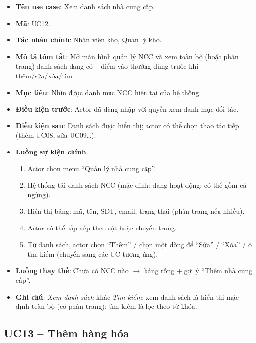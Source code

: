 \begin{itemize}[leftmargin=1.5cm]
    \item \textbf{Tên use case}: Xem danh sách nhà cung cấp.
    \item \textbf{Mã}: UC12.
    \item \textbf{Tác nhân chính}: Nhân viên kho, Quản lý kho.
    \item \textbf{Mô tả tóm tắt}: Mở màn hình quản lý NCC và xem toàn bộ (hoặc phân trang) danh sách đang có -- điểm vào thường dùng trước khi thêm/sửa/xóa/tìm.
    \item \textbf{Mục tiêu}: Nhìn được danh mục NCC hiện tại của hệ thống.
    \item \textbf{Điều kiện trước}: Actor đã đăng nhập với quyền xem danh mục đối tác.
    \item \textbf{Điều kiện sau}: Danh sách được hiển thị; actor có thể chọn thao tác tiếp (thêm UC08, sửa UC09\ldots).
    \item \textbf{Luồng sự kiện chính}:
    \begin{enumerate}
        \item Actor chọn menu ``Quản lý nhà cung cấp''.
        \item Hệ thống tải danh sách NCC (mặc định: đang hoạt động; có thể gồm cả ngừng).
        \item Hiển thị bảng: mã, tên, SĐT, email, trạng thái (phân trang nếu nhiều).
        \item Actor có thể sắp xếp theo cột hoặc chuyển trang.
        \item Từ danh sách, actor chọn ``Thêm'' / chọn một dòng để ``Sửa'' / ``Xóa'' / ô tìm kiếm (chuyển sang các UC tương ứng).
    \end{enumerate}
    \item \textbf{Luồng thay thế}: Chưa có NCC nào $\rightarrow$ bảng rỗng + gợi ý ``Thêm nhà cung cấp''.
    \item \textbf{Ghi chú}: \textit{Xem danh sách} khác \textit{Tìm kiếm}: xem danh sách là hiển thị mặc định toàn bộ (có phân trang); tìm kiếm là lọc theo từ khóa.
\end{itemize}

\subsection{UC13 -- Thêm hàng hóa}

